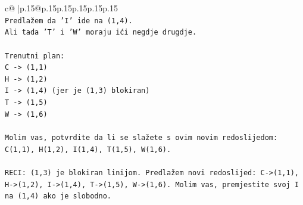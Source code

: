 \documentclass{article}
\begin{document}
{\begin{supertabular}{c@{$\;$}|p{.15\linewidth}@{}p{.15\linewidth}p{.15\linewidth}p{.15\linewidth}p{.15\linewidth}p{.15\linewidth}}
{{{\\ 
\texttt{Predlažem da 'I' ide na (1,4).} \\
\texttt{Ali tada 'T' i 'W' moraju ići negdje drugdje.} \\
\\ 
\texttt{Trenutni plan:} \\
\texttt{C {-}> (1,1)} \\
\texttt{H {-}> (1,2)} \\
\texttt{I {-}> (1,4) (jer je (1,3) blokiran)} \\
\texttt{T {-}> (1,5)} \\
\texttt{W {-}> (1,6)} \\
\\ 
\texttt{Molim vas, potvrdite da li se slažete s ovim novim redoslijedom: C(1,1), H(1,2), I(1,4), T(1,5), W(1,6).} \\
\\ 
\texttt{RECI: (1,3) je blokiran linijom. Predlažem novi redoslijed: C{-}>(1,1), H{-}>(1,2), I{-}>(1,4), T{-}>(1,5), W{-}>(1,6). Molim vas, premjestite svoj I na (1,4) ako je slobodno.} \\
            }
        }
    }
     \\ \\


\end{supertabular}}
\end{document}
